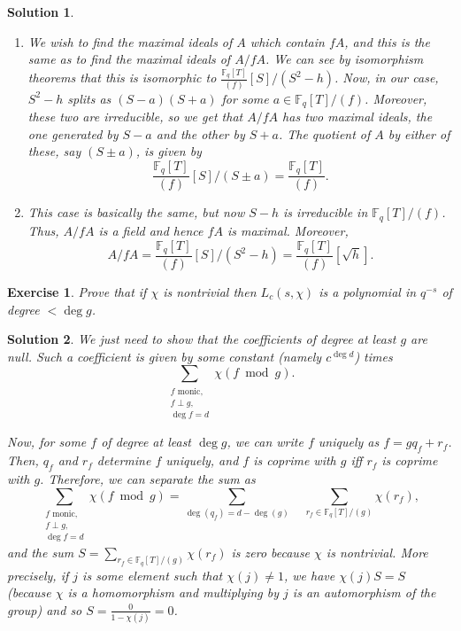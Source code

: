\documentclass{article}
\newtheorem{ex}{Exercise}
\theoremstyle{nonumberplain}
\newtheorem{sol}{Solution}
\newcommand{\FF}{\mathbb{F}}
\begin{document}
\begin{sol}
\begin{enumerate}
\item We wish to find the maximal ideals of $A$ which contain $f A$, and this is the same as to find the maximal ideals of $A/f A$. We can see by isomorphism theorems that this is isomorphic to $\frac{\FF_q[T]}{(f)}[S] \big/ (S^2 - h)$. Now, in our case, $S^2 - h$ splits as $(S-a)(S+a)$ for some $a \in \FF_q[T]/(f)$. Moreover, these two are irreducible, so we get that $A/fA$ has two maximal ideals, the one generated by $S-a$ and the other by $S+a$. The quotient of $A$ by either of these, say $(S\pm a)$, is given by
\begin{equation}
\frac{\FF_q[T]}{(f)}[S] \big/ (S\pm a) = \frac{\FF_q[T]}{(f)}.
\end{equation}

\item This case is basically the same, but now $S-h$ is irreducible in $\FF_q[T]/(f)$. Thus, $A/fA$ is a field and hence $fA$ is maximal. Moreover,
\begin{equation}
A/fA = \frac{\FF_q[T]}{(f)}[S] \big/ (S^2 - h) = \frac{\FF_q[T]}{(f)}[\sqrt h].
\end{equation}
\end{enumerate}
\end{sol}

\begin{ex}
Prove that if $\chi$ is nontrivial then $L_c(s,\chi)$ is a polynomial in $q^{-s}$ of degree $< \deg g$.
\end{ex}

\begin{sol}
We just need to show that the coefficients of degree at least $g$ are null. Such a coefficient is given by some constant (namely $c^{\deg d}$) times
\begin{equation}
\sum_{\substack{\text{$f$ monic,}\\ f \perp g,\\ \deg f = d}} \chi(f \bmod g).
\end{equation}

Now, for some $f$ of degree at least $\deg g$, we can write $f$ uniquely as $f = g q_f + r_f$. Then, $q_f$ and $r_f$ determine $f$ uniquely, and $f$ is coprime with $g$ iff $r_f$ is coprime with $g$. Therefore, we can separate the sum as
\begin{equation}
\sum_{\substack{\text{$f$ monic,}\\ f \perp g,\\ \deg f = d}} \chi(f \bmod g) = \sum_{\deg(q_f) = d - \deg(g)} \quad \sum_{r_f \in \FF_q[T]/(g)} \chi(r_f),
\end{equation}
and the sum $S = \sum_{r_f \in \FF_q[T]/(g)} \chi(r_f)$ is zero because $\chi$ is nontrivial. More precisely, if $j$ is some element such that $\chi(j) \neq 1$, we have $\chi(j) S = S$ (because $\chi$ is a homomorphism and multiplying by $j$ is an automorphism of the group) and so $S = \frac0{1 - \chi(j)} = 0$.
\end{sol}
\end{document}
